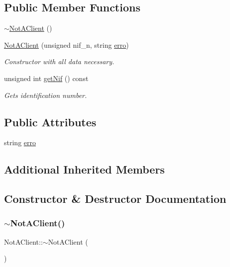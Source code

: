 \subsection*{Public Member Functions}
\begin{DoxyCompactItemize}
\item 
\hyperlink{class_not_a_client_a0efd0fcec7e19f478fa9a93aee5760bd}{$\sim$\+Not\+A\+Client} ()
\item 
\hyperlink{class_not_a_client_ababe63b9416f4dd90045d6086292724d}{Not\+A\+Client} (unsigned nif\+\_\+n, string \hyperlink{class_not_a_client_a5a7444300559fedd328e401de04fff79}{erro})
\begin{DoxyCompactList}\small\item\em Constructor with all data necessary. \end{DoxyCompactList}\item 
unsigned int \hyperlink{class_not_a_client_a70136e2a67ce191dd0091bb8ace19dd9}{get\+Nif} () const
\begin{DoxyCompactList}\small\item\em Gets identification number. \end{DoxyCompactList}\end{DoxyCompactItemize}
\subsection*{Public Attributes}
\begin{DoxyCompactItemize}
\item 
string \hyperlink{class_not_a_client_a5a7444300559fedd328e401de04fff79}{erro}
\end{DoxyCompactItemize}
\subsection*{Additional Inherited Members}


\subsection{Constructor \& Destructor Documentation}
\mbox{\label{class_not_a_client_a0efd0fcec7e19f478fa9a93aee5760bd}} 
\subsubsection{\texorpdfstring{$\sim$\+Not\+A\+Client()}{~NotAClient()}}
{\footnotesize\ttfamily Not\+A\+Client\+::$\sim$\+Not\+A\+Client (\begin{DoxyParamCaption}{ }\end{DoxyParamCaption})}

